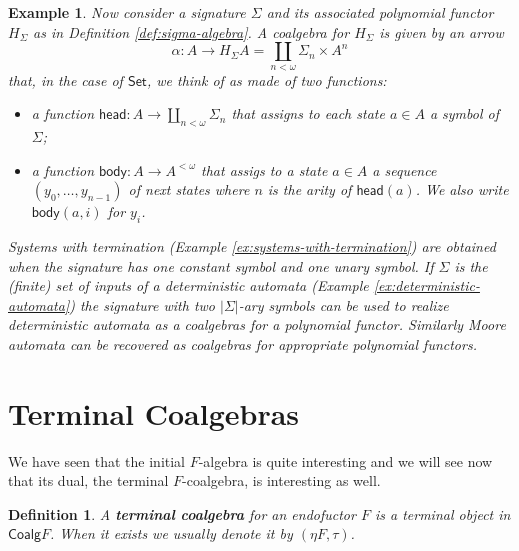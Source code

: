 \documentclass[letterpaper, 11pt, oneside]{memoir}
\theoremstyle{myteo}
\newtheorem{definition}[theorem]{Definition}
\newtheorem{example}[theorem]{Example}
\numberwithin{equation}{section}
\newcommand{\marginnote}[1]{\marginpar{\footnotesize #1}}
\newcommand{\head}{\textsf{head}}
\newcommand{\body}{\textsf{body}}
\newcommand{\Coalg}{\textsf{Coalg}}
\newcommand{\Set}{\textsf{Set}}
\newcommand{\CPO}{\textsf{CPO}}
\begin{document}
\begin{example}
  Now consider a signature \(\Sigma\) and its associated polynomial functor \(H_\Sigma\) as in Definition \ref{def:sigma-algebra}.
  A coalgebra for \(H_\Sigma\) is given by an arrow
  \begin{equation*}
    \alpha : A \to H_\Sigma A = \coprod_{n < \omega}\Sigma_n \times A^n
  \end{equation*}
  that, in the case of \(\Set\), we think of as made of two functions:
  \begin{itemize}
  \item a function \(\head : A \to \coprod_{n < \omega}\Sigma_n\) that assigns to each state \(a \in A\) a symbol of \(\Sigma\);
  \item a function \(\body : A \to A^{<\omega}\) that assigs to a state \(a \in A\) a sequence \((y_0, \ldots, y_{n-1})\) of next states where \(n\) is the arity of \(\head(a)\). We also write \(\body(a, i)\) for \(y_i\).
  \end{itemize}

  Systems with termination (Example \ref{ex:systems-with-termination}) are obtained when the signature has one constant symbol and one unary symbol.
  If \(\Sigma\) is the (finite) set of inputs of a deterministic automata (Example \ref{ex:deterministic-automata}) the signature with two \(|\Sigma|\)-ary symbols can be used to realize deterministic automata as a coalgebras for a polynomial functor.
  Similarly Moore automata can be recovered as coalgebras for appropriate polynomial functors.
\end{example}


\section{Terminal Coalgebras}

We have seen that the initial \(F\)-algebra is quite interesting and we will see now that its dual, the terminal \(F\)-coalgebra, is interesting as well.

\begin{definition}
  A \textbf{terminal coalgebra}\marginnote{terminal coalgebra} for an endofuctor \(F\) is a terminal object in \(\Coalg F\).
  When it exists we usually denote it by \((\eta F, \tau)\).
\end{definition}
\end{document}
